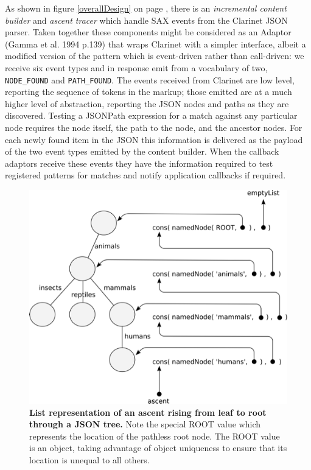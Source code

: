 \documentclass[12pt, ]{article}
\makeatletter
\def\maxwidth{\ifdim\Gin@nat@width>\linewidth\linewidth
\else\Gin@nat@width\fi}
\let\Oldincludegraphics\includegraphics
\renewcommand{\includegraphics}[1]{\Oldincludegraphics[width=\maxwidth]{#1}}
\makeatother
\begin{document}
As shown in figure \ref{overallDesign} on page \pageref{overallDesign},
there is an \emph{incremental content builder} and \emph{ascent tracer}
which handle SAX events from the Clarinet JSON parser. Taken together
these components might be considered as an Adaptor (Gamma et al. 1994
p.139) that wraps Clarinet with a simpler interface, albeit a modified
version of the pattern which is event-driven rather than call-driven: we
receive six event types and in response emit from a vocabulary of two,
\texttt{NODE\_FOUND} and \texttt{PATH\_FOUND}. The events received from
Clarinet are low level, reporting the sequence of tokens in the markup;
those emitted are at a much higher level of abstraction, reporting the
JSON nodes and paths as they are discovered. Testing a JSONPath
expression for a match against any particular node requires the node
itself, the path to the node, and the ancestor nodes. For each newly
found item in the JSON this information is delivered as the payload of
the two event types emitted by the content builder. When the callback
adaptors receive these events they have the information required to test
registered patterns for matches and notify application callbacks if
required.

\begin{figure}[htbp]
\centering
\includegraphics{images/ascent.png}
\caption{\textbf{List representation of an ascent rising from leaf to
root through a JSON tree.} Note the special ROOT value which represents
the location of the pathless root node. The ROOT value is an object,
taking advantage of object uniqueness to ensure that its location is
unequal to all others. \label{ascent}}
\end{figure}
\end{document}
